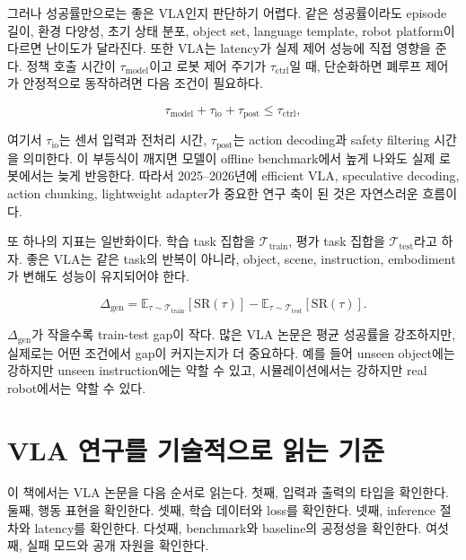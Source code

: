 그러나 성공률만으로는 좋은 VLA인지 판단하기 어렵다. 같은 성공률이라도 episode 길이, 환경 다양성, 초기 상태 분포, object set, language template, robot platform이 다르면 난이도가 달라진다. 또한 VLA는 latency가 실제 제어 성능에 직접 영향을 준다. 정책 호출 시간이 $\tau_{\mathrm{model}}$이고 로봇 제어 주기가 $\tau_{\mathrm{ctrl}}$일 때, 단순화하면 폐루프 제어가 안정적으로 동작하려면 다음 조건이 필요하다.

\begin{equation}
  \tau_{\mathrm{model}} + \tau_{\mathrm{io}} + \tau_{\mathrm{post}} \le \tau_{\mathrm{ctrl}},
  \label{eq:latency_budget}
\end{equation}

여기서 $\tau_{\mathrm{io}}$는 센서 입력과 전처리 시간, $\tau_{\mathrm{post}}$는 action decoding과 safety filtering 시간을 의미한다. 이 부등식이 깨지면 모델이 offline benchmark에서 높게 나와도 실제 로봇에서는 늦게 반응한다. 따라서 2025--2026년에 efficient VLA, speculative decoding, action chunking, lightweight adapter가 중요한 연구 축이 된 것은 자연스러운 흐름이다.

또 하나의 지표는 일반화이다. 학습 task 집합을 $\mathcal{T}_{\mathrm{train}}$, 평가 task 집합을 $\mathcal{T}_{\mathrm{test}}$라고 하자. 좋은 VLA는 같은 task의 반복이 아니라, object, scene, instruction, embodiment가 변해도 성능이 유지되어야 한다.

\begin{equation}
  \Delta_{\mathrm{gen}}
  =
  \mathbb{E}_{\tau \sim \mathcal{T}_{\mathrm{train}}}[\mathrm{SR}(\tau)]
  -
  \mathbb{E}_{\tau \sim \mathcal{T}_{\mathrm{test}}}[\mathrm{SR}(\tau)].
  \label{eq:generalization_gap}
\end{equation}

$\Delta_{\mathrm{gen}}$가 작을수록 train-test gap이 작다. 많은 VLA 논문은 평균 성공률을 강조하지만, 실제로는 어떤 조건에서 gap이 커지는지가 더 중요하다. 예를 들어 unseen object에는 강하지만 unseen instruction에는 약할 수 있고, 시뮬레이션에서는 강하지만 real robot에서는 약할 수 있다.

\section{VLA 연구를 기술적으로 읽는 기준}

이 책에서는 VLA 논문을 다음 순서로 읽는다. 첫째, 입력과 출력의 타입을 확인한다. 둘째, 행동 표현을 확인한다. 셋째, 학습 데이터와 loss를 확인한다. 넷째, inference 절차와 latency를 확인한다. 다섯째, benchmark와 baseline의 공정성을 확인한다. 여섯째, 실패 모드와 공개 자원을 확인한다.

